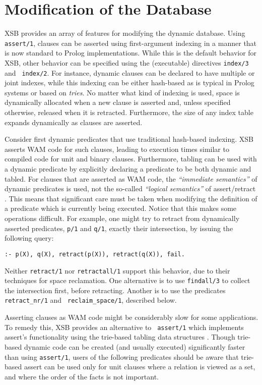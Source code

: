 \section{Modification of the Database} \label{sec:assert}
XSB provides an array of features for modifying the dynamic database.
Using {\tt assert/1}, clauses can be asserted using first-argument
indexing in a manner that is now standard to Prolog implementations.
While this is the default behavior for XSB, other behavior can be
specified using the (executable) directives {\tt index/3} and {\tt
index/2}.  For instance, dynamic clauses can be declared to have
multiple or joint indexes, while this indexing can be either
hash-based as is typical in Prolog systems or based on {\em tries}.
No matter what kind of indexing is used, space is dynamically
allocated when a new clause is asserted and, unless specified
otherwise, released when it is retracted.  Furthermore, the size of
any index table expands dynamically as clauses are asserted.

Consider first dynamic predicates that use traditional hash-based
indexing.  XSB asserts WAM code for such clauses, leading to execution
times similar to compiled code for unit and binary clauses.
Furthermore, tabling can be used with a dynamic predicate by
explicitly declaring a predicate to be both dynamic and tabled.  For
clauses that are asserted as WAM code, the {\em ``immediate
semantics''} of dynamic predicates is used, not the so-called {\em
``logical semantics''} of assert/retract \cite{LiOk87}. This means
that significant care must be taken when modifying the definition of a
predicate which is currently being executed. Notice that this makes
some operations difficult. For example, one might try to retract from
dynamically asserted predicates, {\tt p/1} and {\tt q/1}, exactly
their intersection, by issuing the following query:
\begin{center} 
{\tt :- p(X), q(X), retract(p(X)), retract(q(X)), fail.}
\end{center}
Neither {\tt retract/1} nor {\tt retractall/1} support this behavior,
due to their techniques for space reclamation.  One alternative is to
use {\tt findall/3} to collect the intersection first, before retracting.
Another is to use the predicates {\tt retract\_nr/1} and {\tt
reclaim\_space/1}, described below.  

Asserting clauses as WAM code might be considerably slow for some
applications.  To remedy this, XSB provides an alternative to {\tt
assert/1} which implements assert's functionality using the trie-based
tabling data structures \cite{RRSSW98}.  Though trie-based dynamic
code can be created (and usually executed) significantly faster than
using {\tt assert/1}, users of the following predicates should be
aware that trie-based assert can be used only for unit clauses where a
relation is viewed as a set, and where the order of the facts is not
important.

